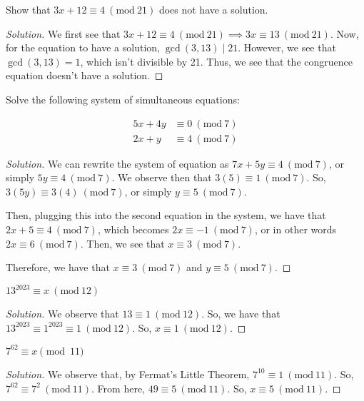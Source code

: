 \documentclass{article}
\newenvironment{solution}{\begin{proof}[Solution]}{\end{proof}}
\newcommand{\Mod}[1]{\ (\mathrm{mod}\ {#1})}
\renewcommand{\gcd}[1]{\ \text{gcd}\ ({#1})}
\begin{document}
\begin{hw}
	Show that $3x + 12 \equiv 4 \Mod{21}$ does not have a solution.
\end{hw}
\begin{solution}
	We first see that $3x + 12 \equiv 4 \Mod{21} \implies 3x \equiv 13 \Mod{21}$. Now, for the equation to have a solution, $\gcd{3, 13} \mid 21$. However, we see that $\gcd{3, 13} = 1$, which isn't divisible by 21. Thus, we see that the congruence equation doesn't have a solution.
\end{solution}

\begin{hw}
	Solve the following system of simultaneous equations:
	
	\begin{align*}
		5x + 4y &\equiv 0 \Mod{7} \\
		2x + y &\equiv 4 \Mod{7}
	\end{align*}
\end{hw}
\begin{solution}
	We can rewrite the system of equation as $7x + 5y \equiv 4 \Mod{7}$, or simply $5y \equiv 4 \Mod{7}$. We observe then that $3(5) \equiv 1 \Mod{7}$. So, $3(5y) \equiv 3(4) \Mod{7}$, or simply $y \equiv 5 \Mod{7}$.
	
	Then, plugging this into the second equation in the system, we have that $2x + 5 \equiv 4 \Mod{7}$, which becomes $2x \equiv -1 \Mod{7}$, or in other words $2x \equiv 6 \Mod{7}$. Then, we see that $x \equiv 3 \Mod{7}$.
	
	Therefore, we have that $x \equiv 3 \Mod{7}$ and $y \equiv 5 \Mod{7}$.
\end{solution}

\begin{hw}
	$13^{2023} \equiv x \Mod{12}$
\end{hw}
\begin{solution}
	We observe that $13 \equiv 1 \Mod{12}$. So, we have that $13^{2023} \equiv 1^{2023} \equiv 1 \Mod{12}$. So, $x \equiv 1 \Mod{12}$.
\end{solution}

\begin{hw}
	$7^{62} \equiv x \pmod{11}$
\end{hw}
\begin{solution}
	We observe that, by Fermat's Little Theorem, $7^{10} \equiv 1 \Mod{11}$. So, $7^{62} \equiv 7^{2} \Mod{11}$. From here, $49 \equiv 5 \Mod{11}$. So, $x \equiv 5 \Mod{11}$.
\end{solution}
\end{document}

